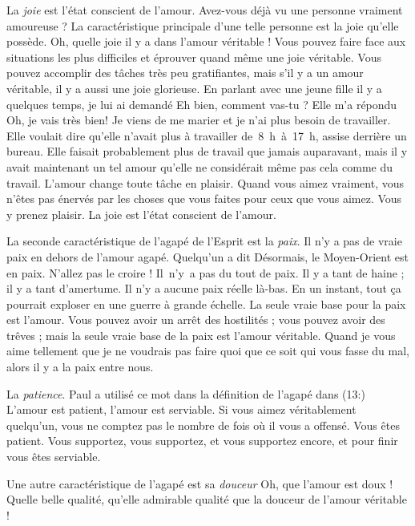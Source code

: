 La \emph{joie} est l'état conscient de l'amour.
 Avez-vous déjà vu une
 personne vraiment amoureuse ?
 La caractéristique principale d'une telle personne est la joie
 qu'elle possède. Oh, quelle joie il y a dans l'amour véritable !
 Vous pouvez faire face aux situations les plus difficiles
 et éprouver quand même une joie véritable. Vous pouvez accomplir
 des tâches très peu gratifiantes, mais s'il y a un amour véritable,
 il y a aussi une joie glorieuse. En parlant avec une jeune fille
 il y a quelques temps, je lui ai demandé\frcolon{}
 \Og Eh bien, comment vas-tu ? \Fg{} Elle m'a répondu\frcolon{}
 \Og Oh, je vais très bien! Je viens de me marier et je n'ai plus besoin
 de travailler. \Fg{}
 Elle voulait dire qu'elle n'avait plus à travailler de~8~h~à~17~h,
 assise derrière un bureau. Elle faisait probablement plus de travail
 que jamais auparavant, mais il y avait maintenant un tel amour
 qu'elle ne considérait même pas cela comme du travail.
 L'amour change toute tâche en plaisir. Quand vous aimez vraiment,
 vous n'êtes pas énervés par les choses que vous faites
 pour ceux que vous aimez. Vous y prenez plaisir.
 La joie est l'état conscient de l'amour.

La seconde caractéristique de l'agapé de l'Esprit est la \emph{paix}.
 Il n'y a pas de vraie paix en dehors de l'amour agapé.
 Quelqu'un a dit\frcolon{} \Og Désormais, le Moyen-Orient est en paix. \Fg{}
 N'allez pas le croire ! Il~n'y~a pas du tout de paix.
 Il y a tant de haine ; il y a tant d'amertume.
 Il n'y a aucune paix réelle là-bas. En un instant, tout ça pourrait
 exploser en une guerre à grande échelle.
 La seule vraie base pour la paix est l'amour.
 Vous pouvez avoir un arrêt des hostilités ; vous pouvez avoir des trêves ;
 mais la seule vraie base de la paix est l'amour véritable.
 Quand je vous aime tellement que je ne voudrais pas faire
 quoi que ce soit qui vous fasse du mal, alors il y a la paix entre nous.

La \emph{patience}. Paul a utilisé ce mot dans la définition de l'agapé
 dans (13:)\frcolon{}
 \Og L'amour est patient, l'amour est serviable. \Fg{}
 Si vous aimez véritablement quelqu'un, vous ne comptez pas
 le nombre de fois où il vous a offensé. Vous êtes patient.
 Vous supportez, vous supportez, et vous supportez encore,
 et pour finir vous êtes serviable.

Une autre caractéristique de l'agapé est sa \emph{douceur}\frcolon{}
 Oh, que l'amour est doux ! Quelle belle qualité,
 qu'elle admirable qualité que la douceur de l'amour véritable !

